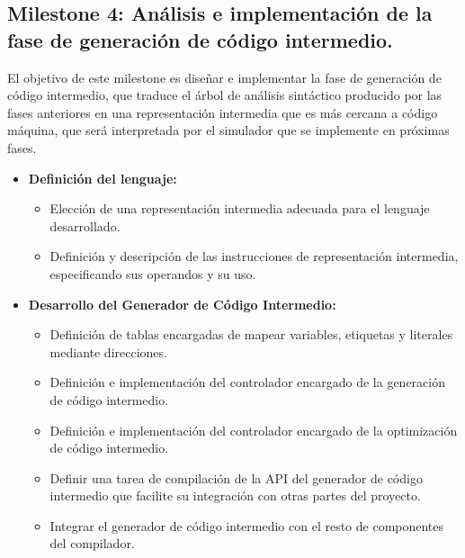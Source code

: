 \subsection{Milestone 4: Análisis e implementación de la fase de generación de código intermedio.}
El objetivo de este milestone es diseñar e implementar la fase de generación de código intermedio, que traduce el árbol de análisis sintáctico producido por las fases anteriores en una representación intermedia que es más cercana a código máquina,  que será interpretada por el simulador que se implemente en próximas fases.

\begin{itemize}
    \item \textbf{Definición del lenguaje:}
    \begin{itemize}
        \item Elección de una representación intermedia adecuada para el lenguaje desarrollado.
        \item Definición y descripción de las instrucciones de representación intermedia, especificando sus operandos y su uso.
    \end{itemize}
    
    \item \textbf{Desarrollo del Generador de Código Intermedio:}
    \begin{itemize}
        \item Definición de tablas encargadas de mapear variables, etiquetas y literales mediante direcciones.
        \item Definición e implementación del controlador encargado de la generación de código intermedio.
        \item Definición e implementación del controlador encargado de la optimización de código intermedio.
        \item Definir una tarea de compilación de la API del generador de código intermedio que facilite su integración con otras partes del proyecto.
        \item Integrar el generador de código intermedio con el resto de componentes del compilador.
    \end{itemize}


\end{itemize}
